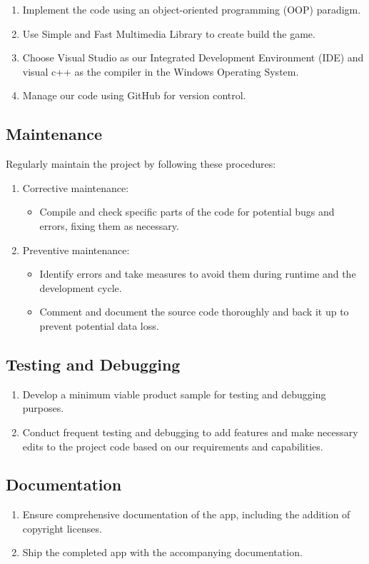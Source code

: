 	\begin{enumerate}
		
		\item Implement the code using an object-oriented programming (OOP) paradigm. 
		\item Use Simple and Fast Multimedia Library to create build the game.
		\item Choose Visual Studio as our Integrated Development Environment (IDE) and visual c++ as the compiler in the Windows Operating System.
		\item Manage our code using GitHub for version control.
		
	\end{enumerate}
	
 \subsection{Maintenance}
	Regularly maintain the project by following these procedures:
	\begin{enumerate}
		
		\item Corrective maintenance:
		\begin{itemize}
			\item Compile and check specific parts of the code for potential bugs and errors, fixing them as necessary.
		\end{itemize}
		
		\item  Preventive maintenance:
		\begin{itemize}
			
			\item Identify errors and take measures to avoid them during runtime and the development cycle.
			\item Comment and document the source code thoroughly and back it up to prevent potential data loss.
			
			
		\end{itemize}
	\end{enumerate}

	\subsection{Testing and Debugging}
	\begin{enumerate}
		
		\item Develop a minimum viable product sample for testing and debugging purposes.
		\item Conduct frequent testing and debugging to add features and make necessary edits to the project code based on our requirements and capabilities.
		
	\end{enumerate}
	\subsection{ Documentation}
	\begin{enumerate}
		\item Ensure comprehensive documentation of the app, including the addition of copyright licenses.
		\item Ship the completed app with the accompanying documentation.
	\end{enumerate}


\newpage


